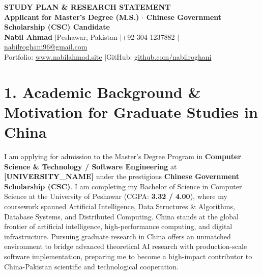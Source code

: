 \documentclass[10pt,a4paper]{article}
\begin{document}
\pagestyle{empty}

\begin{center}
    {\large \textbf{STUDY PLAN \& RESEARCH STATEMENT}} \\[2pt]
    \textbf{Applicant for Master’s Degree (M.S.) $\cdot$ Chinese Government Scholarship (CSC) Candidate} \\[2pt]
    \small \textbf{Nabil Ahmad} \quad$|$\quad Peshawar, Pakistan \quad$|$\quad +92 304 1237882 \quad$|$\quad \href{mailto:nabilroghani96@gmail.com}{nabilroghani96@gmail.com} \\[1pt]
    Portfolio: \href{https://www.nabilahmad.site}{www.nabilahmad.site} \quad$|$\quad GitHub: \href{https://github.com/nabilroghani}{github.com/nabilroghani}
\end{center}
\vspace{-4pt}

\section{1. Academic Background \& Motivation for Graduate Studies in China}
I am applying for admission to the Master’s Degree Program in \textbf{Computer Science \& Technology / Software Engineering} at \textbf{[UNIVERSITY\_NAME]} under the prestigious \textbf{Chinese Government Scholarship (CSC)}. I am completing my Bachelor of Science in Computer Science at the University of Peshawar (CGPA: \textbf{3.32 / 4.00}), where my coursework spanned Artificial Intelligence, Data Structures \& Algorithms, Database Systems, and Distributed Computing. China stands at the global frontier of artificial intelligence, high-performance computing, and digital infrastructure. Pursuing graduate research in China offers an unmatched environment to bridge advanced theoretical AI research with production-scale software implementation, preparing me to become a high-impact contributor to China-Pakistan scientific and technological cooperation.

\end{document}
